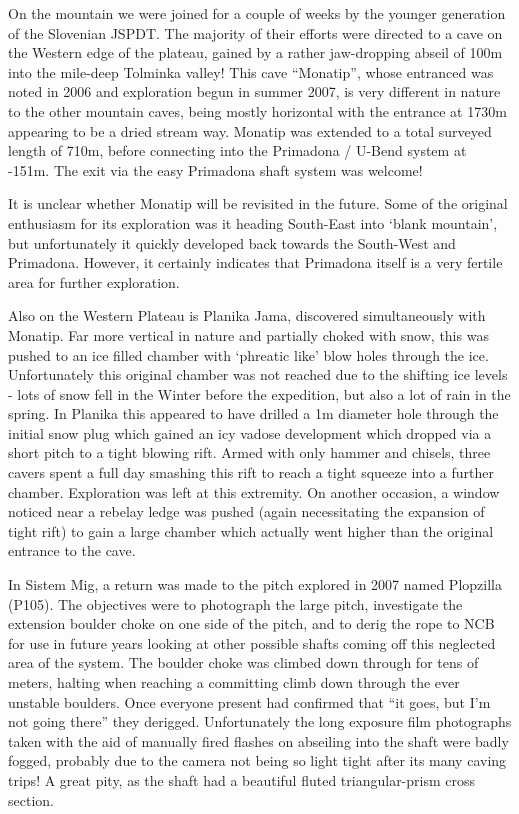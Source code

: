 On the mountain we were joined for a couple of weeks by the younger
generation of the Slovenian JSPDT. The majority of their efforts were
directed to a cave on the Western edge of the plateau, gained by a
rather jaw-dropping abseil of 100m into the mile-deep Tolminka valley!
This cave ``Monatip'', whose entranced was noted in 2006 and exploration
begun in summer 2007, is very different in nature to the other mountain
caves, being mostly horizontal with the entrance at 1730m appearing to
be a dried stream way. Monatip was extended to a total surveyed length
of 710m, before connecting into the Primadona / U-Bend system at -151m.
The exit via the easy Primadona shaft system was welcome!

It is unclear whether Monatip will be revisited in the future. Some of
the original enthusiasm for its exploration was it heading South-East
into `blank mountain', but unfortunately it quickly developed back
towards the South-West and Primadona. However, it certainly indicates
that Primadona itself is a very fertile area for further exploration.

Also on the Western Plateau is Planika Jama, discovered simultaneously
with Monatip. Far more vertical in nature and partially choked with
snow, this was pushed to an ice filled chamber with `phreatic like' blow
holes through the ice. Unfortunately this original chamber was not
reached due to the shifting ice levels - lots of snow fell in the Winter
before the expedition, but also a lot of rain in the spring. In Planika
this appeared to have drilled a 1m diameter hole through the initial
snow plug which gained an icy vadose development which dropped via a
short pitch to a tight blowing rift. Armed with only hammer and chisels,
three cavers spent a full day smashing this rift to reach a tight
squeeze into a further chamber. Exploration was left at this extremity.
On another occasion, a window noticed near a rebelay ledge was pushed
(again necessitating the expansion of tight rift) to gain a large
chamber which actually went higher than the original entrance to the
cave.

In Sistem Mig, a return was made to the pitch explored in 2007 named
Plopzilla (P105). The objectives were to photograph the large pitch,
investigate the extension boulder choke on one side of the pitch, and to
derig the rope to NCB for use in future years looking at other possible
shafts coming off this neglected area of the system. The boulder choke
was climbed down through for tens of meters, halting when reaching a
committing climb down through the ever unstable boulders. Once everyone
present had confirmed that ``it goes, but I'm not going there'' they
derigged. Unfortunately the long exposure film photographs taken with
the aid of manually fired flashes on abseiling into the shaft were badly
fogged, probably due to the camera not being so light tight after its
many caving trips! A great pity, as the shaft had a beautiful fluted
triangular-prism cross section.


